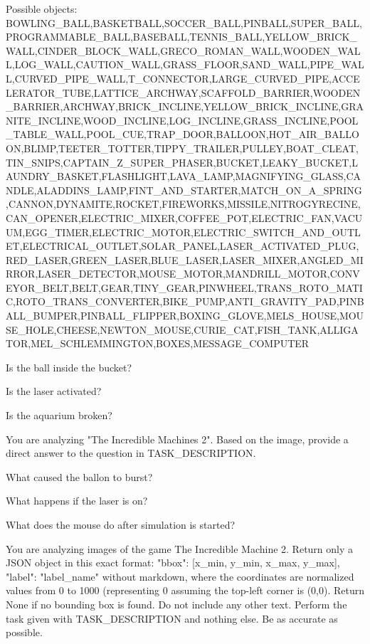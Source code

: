Possible objects:
BOWLING_BALL,BASKETBALL,SOCCER_BALL,PINBALL,SUPER_BALL,PROGRAMMABLE_BALL,BASEBALL,TENNIS_BALL,YELLOW_BRICK_WALL,CINDER_BLOCK_WALL,GRECO_ROMAN_WALL,WOODEN_WALL,LOG_WALL,CAUTION_WALL,GRASS_FLOOR,SAND_WALL,PIPE_WALL,CURVED_PIPE_WALL,T_CONNECTOR,LARGE_CURVED_PIPE,ACCELERATOR_TUBE,LATTICE_ARCHWAY,SCAFFOLD_BARRIER,WOODEN_BARRIER,ARCHWAY,BRICK_INCLINE,YELLOW_BRICK_INCLINE,GRANITE_INCLINE,WOOD_INCLINE,LOG_INCLINE,GRASS_INCLINE,POOL_TABLE_WALL,POOL_CUE,TRAP_DOOR,BALLOON,HOT_AIR_BALLOON,BLIMP,TEETER_TOTTER,TIPPY_TRAILER,PULLEY,BOAT_CLEAT,TIN_SNIPS,CAPTAIN_Z_SUPER_PHASER,BUCKET,LEAKY_BUCKET,LAUNDRY_BASKET,FLASHLIGHT,LAVA_LAMP,MAGNIFYING_GLASS,CANDLE,ALADDINS_LAMP,FINT_AND_STARTER,MATCH_ON_A_SPRING,CANNON,DYNAMITE,ROCKET,FIREWORKS,MISSILE,NITROGYRECINE,CAN_OPENER,ELECTRIC_MIXER,COFFEE_POT,ELECTRIC_FAN,VACUUM,EGG_TIMER,ELECTRIC_MOTOR,ELECTRIC_SWITCH_AND_OUTLET,ELECTRICAL_OUTLET,SOLAR_PANEL,LASER_ACTIVATED_PLUG,RED_LASER,GREEN_LASER,BLUE_LASER,LASER_MIXER,ANGLED_MIRROR,LASER_DETECTOR,MOUSE_MOTOR,MANDRILL_MOTOR,CONVEYOR_BELT,BELT,GEAR,TINY_GEAR,PINWHEEL,TRANS_ROTO_MATIC,ROTO_TRANS_CONVERTER,BIKE_PUMP,ANTI_GRAVITY_PAD,PINBALL_BUMPER,PINBALL_FLIPPER,BOXING_GLOVE,MELS_HOUSE,MOUSE_HOLE,CHEESE,NEWTON_MOUSE,CURIE_CAT,FISH_TANK,ALLIGATOR,MEL_SCHLEMMINGTON,BOXES,MESSAGE_COMPUTER


Is the ball inside the bucket?

Is the laser activated?

Is the aquarium broken?



You are analyzing "The Incredible Machines 2". 
Based on the image, provide a direct answer to the question in TASK_DESCRIPTION. 


What caused the ballon to burst?

What happens if the laser is on?

What does the mouse do after simulation is started?


You are analyzing images of the game The Incredible Machine 2.
Return only a JSON object in this exact format: {"bbox": [x_min, y_min, x_max, y_max], "label": "label_name"} without markdown,
where the coordinates are normalized values from 0 to 1000 (representing 0%
assuming the top-left corner is (0,0). Return None if no bounding box is found. Do not include any other text.
Perform the task given with TASK_DESCRIPTION and nothing else. Be as accurate as possible.

